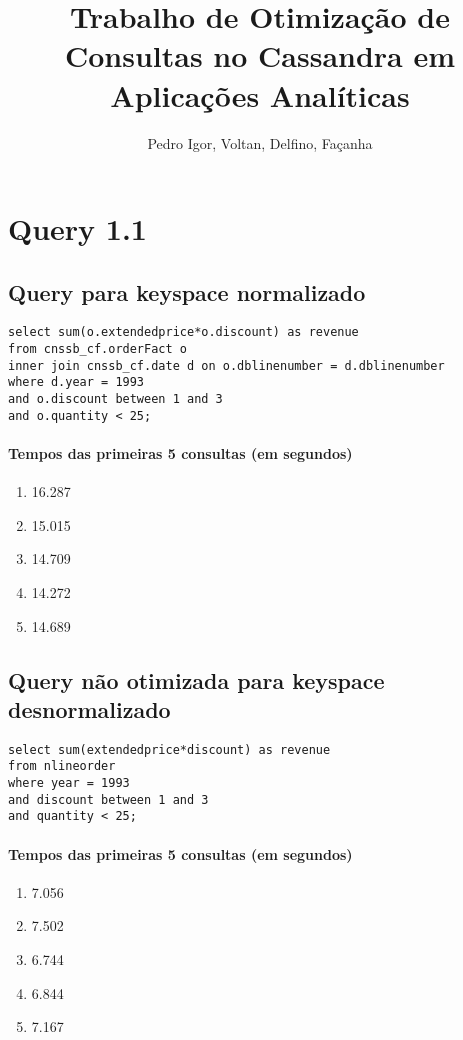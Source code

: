 \documentclass[12pt]{article}
\title{Trabalho de Otimização de Consultas no Cassandra em Aplicações Analíticas}
\author{Pedro Igor, Voltan, Delfino, Façanha }
\begin{document}
 

\maketitle

\section{Query 1.1}

\subsection{Query para keyspace normalizado}

\begin{lstlisting}
select sum(o.extendedprice*o.discount) as revenue
from cnssb_cf.orderFact o
inner join cnssb_cf.date d on o.dblinenumber = d.dblinenumber
where d.year = 1993
and o.discount between 1 and 3
and o.quantity < 25;
\end{lstlisting}

\paragraph{Tempos das primeiras 5 consultas (em segundos)}
\begin{enumerate}
\item 16.287
\item 15.015
\item 14.709
\item 14.272
\item 14.689
\end{enumerate}

\subsection{Query não otimizada para keyspace desnormalizado}

\begin{lstlisting}
select sum(extendedprice*discount) as revenue
from nlineorder
where year = 1993
and discount between 1 and 3
and quantity < 25;
\end{lstlisting}

\paragraph{Tempos das primeiras 5 consultas (em segundos)}
\begin{enumerate}
\item 7.056
\item 7.502 
\item 6.744 
\item 6.844 
\item 7.167
\end{enumerate}
\end{document}
